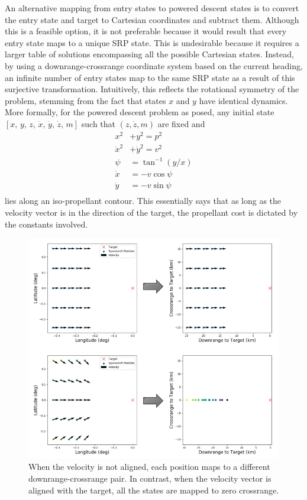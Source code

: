 \documentclass[letterpaper, preprint, paper,11pt]{AAS}
\begin{document}
An alternative mapping from entry states to powered descent states is to convert the entry state and target to Cartesian coordinates and subtract them. Although this is a feasible option, it is not preferable because it would result that every entry state maps to a unique SRP state. This is undesirable because it requires a larger table of solutions encompassing all the possible Cartesian states. Instead, by using a downrange-crossrange coordinate system based on the current heading, an infinite number of entry states map to the same SRP state as a result of this surjective transformation. Intuitively, this reflects the rotational symmetry of the problem, stemming from the fact that states $ x $ and $ y $ have identical dynamics. More formally, for the powered descent problem as posed, any initial state $[ x,\, y,\, z,\, \dot{x},\, \dot{y},\, \dot{z},\, m]$ such that $(z, \dot{z}, m)$ are fixed and 
\begin{align}
x^2 &+ y^2 = p^2 \\
\dot{x}^2 &+ \dot{y}^2 = v^2 \\
\psi &= \tan^{-1}(y/x) \\
\dot{x} &= -v\cos\psi \\
\dot{y} &= -v\sin\psi \\
\end{align}
lies along an iso-propellant contour. This essentially says that as long as the velocity vector is in the direction of the target, the propellant cost is dictated by the constants involved.
\begin{figure}[h!]
	\centering
	\includegraphics[width=1\textwidth]{EntryToSRP} 
	\caption{When the velocity is not aligned, each position maps to a different downrange-crossrange pair. In contrast, when the velocity vector is aligned with the target, all the states are mapped to zero crossrange.}
	\label{fig_entry_to_srp}
\end{figure}
\end{document}
